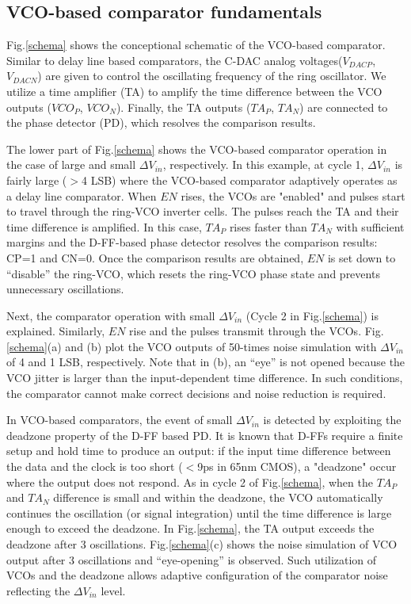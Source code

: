 \documentclass[journal]{IEEEtran}
\begin{document}
\subsection{VCO-based comparator fundamentals}
Fig.\ref{schema} shows the conceptional schematic of the VCO-based comparator. Similar to delay line based comparators\cite{agnes20089}, the C-DAC analog voltages($V_{DACP}$, $V_{DACN}$) are given to control the oscillating frequency of the ring oscillator. We utilize a time amplifier (TA)\cite{lee20089} to amplify the time difference between the VCO outputs ($VCO_P$, $VCO_N$). Finally, the TA outputs ($TA_P$, $TA_N$) are connected to the phase detector (PD), which resolves the comparison results.

The lower part of Fig.\ref{schema} shows the VCO-based comparator operation in the case of large and small $\Delta V_{in}$, respectively. In this example, at cycle 1, $\Delta V_{in}$ is fairly large ($>$4 LSB) where the VCO-based comparator adaptively operates as a delay line comparator. When $EN$ rises, the VCOs are "enabled" and pulses start to travel through the ring-VCO inverter cells. The pulses reach the TA and their time difference is amplified. In this case, $TA_P$ rises faster than $TA_N$ with sufficient margins and the D-FF-based phase detector resolves the comparison results: CP=1 and CN=0. Once the comparison results are obtained, $EN$ is set down to “disable” the ring-VCO, which resets the ring-VCO phase state and prevents unnecessary oscillations.

Next, the comparator operation with small $\Delta V_{in}$ (Cycle 2 in Fig.\ref{schema}) is explained. Similarly, $EN$ rise and the pulses transmit through the VCOs. Fig.\ref{schema}(a) and (b) plot the VCO outputs of 50-times noise simulation with $\Delta V_{in}$ of 4 and 1 LSB, respectively. Note that in (b), an “eye” is not opened because the VCO jitter is larger than the input-dependent time difference. In such conditions, the comparator cannot make correct decisions and noise reduction is required.

In VCO-based comparators, the event of small $\Delta V_{in}$ is detected by exploiting the deadzone property of the D-FF based PD. It is known that D-FFs require a finite setup and hold time to produce an output: if the input time difference between the data and the clock is too short ($<$9ps in 65nm CMOS), a "deadzone" occur where the output does not respond.
As in cycle 2 of Fig.\ref{schema}, when the $TA_P$ and $TA_N$ difference is small and within the deadzone, the VCO automatically continues the oscillation (or signal integration) until the time difference is large enough to exceed the deadzone. In Fig.\ref{schema}, the TA output exceeds the deadzone after 3 oscillations. Fig.\ref{schema}(c) shows the noise simulation of VCO output after 3 oscillations and “eye-opening” is observed. Such utilization of VCOs and the deadzone allows adaptive configuration of the comparator noise reflecting the $\Delta V_{in}$ level.
\end{document}
